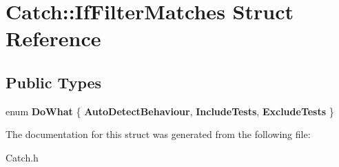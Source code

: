 \hypertarget{struct_catch_1_1_if_filter_matches}{\section{Catch\-:\-:If\-Filter\-Matches Struct Reference}
\label{struct_catch_1_1_if_filter_matches}
}
\subsection*{Public Types}
\begin{DoxyCompactItemize}
\item 
enum {\bfseries Do\-What} \{ {\bfseries Auto\-Detect\-Behaviour}, 
{\bfseries Include\-Tests}, 
{\bfseries Exclude\-Tests}
 \}
\end{DoxyCompactItemize}


The documentation for this struct was generated from the following file\-:\begin{DoxyCompactItemize}
\item 
Catch.\-h\end{DoxyCompactItemize}
